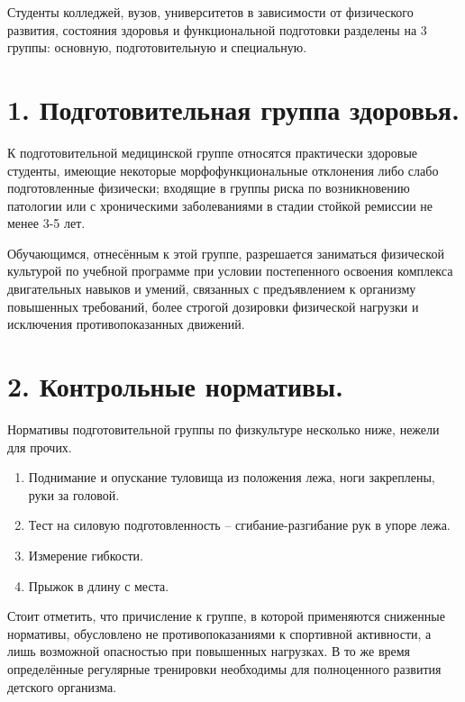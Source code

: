 \documentclass[bachelor, och, referat ]{SCWorks}
\begin{document}
Студенты колледжей, вузов, университетов в зависимости от физического развития, состояния здоровья и функциональной подготовки разделены на 3 группы: основную, подготовительную и специальную. 
\newpage

\section{1. Подготовительная группа здоровья.}
К подготовительной медицинской группе относятся практически здоровые студенты, имеющие некоторые морфофункциональные отклонения либо слабо подготовленные физически; входящие в группы риска по возникновению патологии или с хроническими заболеваниями в стадии стойкой ремиссии не менее 3-5 лет.

Обучающимся, отнесённым к этой группе, разрешается заниматься физической культурой по учебной программе при условии постепенного освоения комплекса двигательных навыков и умений, связанных с предъявлением к организму повышенных требований, более строгой дозировки физической нагрузки и исключения противопоказанных движений.
\newpage

\section{2. Контрольные нормативы.}
Нормативы подготовительной группы по физкультуре несколько ниже, нежели для прочих.
\begin{enumerate}
\item{Поднимание и опускание туловища из положения лежа, ноги закреплены, руки за головой.}
\item{Тест на силовую подготовленность – сгибание-разгибание рук в упоре лежа.}
\item{Измерение гибкости.}
\item{Прыжок в длину с места.}
\end{enumerate}
Стоит отметить, что причисление к группе, в которой применяются сниженные нормативы, обусловлено не противопоказаниями к спортивной активности, а лишь возможной опасностью при повышенных нагрузках. В то же время определённые регулярные тренировки необходимы для полноценного развития детского организма. 
\newpage
\end{document}
